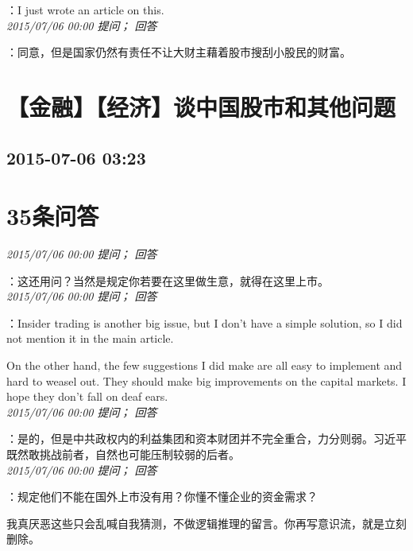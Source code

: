 \documentclass[twocolumn]{ctexart}
\begin{document}
：I just wrote an article on this.\\

\textit{\hfill\noindent\small 2015/07/06 00:00 提问； 回答}

：同意，但是国家仍然有责任不让大财主藉着股市搜刮小股民的财富。\\


\section{【金融】【经济】谈中国股市和其他问题}
\subsection{2015-07-06 03:23}


\section{35条问答}

\textit{\hfill\noindent\small 2015/07/06 00:00 提问； 回答}

：这还用问？当然是规定你若要在这里做生意，就得在这里上市。\\

\textit{\hfill\noindent\small 2015/07/06 00:00 提问； 回答}

：Insider trading is another big issue, but I don't have a simple solution, so I did not mention it in the main article.

On the other hand, the few suggestions I did make are all easy to implement and hard to weasel out. They should make big improvements on the capital markets. I hope they don't fall on deaf ears.\\

\textit{\hfill\noindent\small 2015/07/06 00:00 提问； 回答}

：是的，但是中共政权内的利益集团和资本财团并不完全重合，力分则弱。习近平既然敢挑战前者，自然也可能压制较弱的后者。\\

\textit{\hfill\noindent\small 2015/07/06 00:00 提问； 回答}

：规定他们不能在国外上市没有用？你懂不懂企业的资金需求？

我真厌恶这些只会乱喊自我猜测，不做逻辑推理的留言。你再写意识流，就是立刻删除。\\
\end{document}
